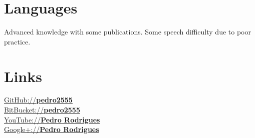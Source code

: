 \documentclass[letterpaper]{deedy-resume} %
\begin{document}
\begin{minipage}[t]{0.33\textwidth}
\sectionspace

\section{Languages}
Advanced knowledge with some publications. Some speech difficulty due to poor practice.

\section{Links}
\href{https://github.com/pedro2555}{GitHub://\textbf{pedro2555}}\\
\href{https://bitbucket.org/pedro2555}{BitBucket://\textbf{pedro2555}}\\
\href{https://www.youtube.com/channel/UCxvDHtW_fPVIPHXOBzxt6Fg}{YouTube://\textbf{Pedro Rodrigues}}\\
\href{https://plus.google.com/105867523802923906663/posts}{Google+://\textbf{Pedro Rodrigues}}\\

\end{minipage}
\hfill
%
%
\end{document}
